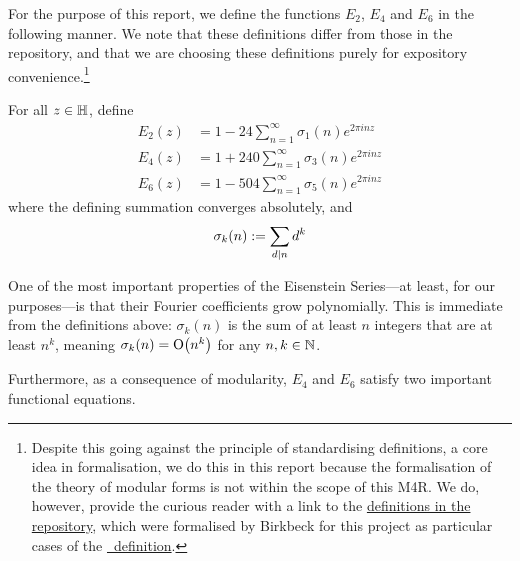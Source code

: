 For the purpose of this report, we define the functions $E_2$, $E_4$ and $E_6$ in the following manner. We note that these definitions differ from those in the repository, and that we are choosing these definitions purely for expository convenience.\footnote{{Despite this going against the principle of standardising definitions, a core idea in formalisation, we do this in this report because the formalisation of the theory of modular forms is not within the scope of this M4R. We do, however, provide the curious reader with a link to the \href{https://github.com/thefundamentaltheor3m/Sphere-Packing-Lean/blob/704c085b1251cc0c208cc373f4e6105af359edd4/SpherePacking/ModularForms/Eisenstein.lean\#L28}{definitions in the repository}, which were formalised by Birkbeck for this project as particular cases of the \href{https://github.com/leanprover-community/mathlib4/blob/70816aec3a0f7bb98ac42991652a66b6405e1a00/Mathlib/NumberTheory/ModularForms/EisensteinSeries/Basic.lean\#L28-L35}{\mathlib\ definition}.}}

\begin{boxdefinition}\label{Ch2:Def:EisensteinSeries_geq_4}
    For all $z \in \mathbb{H}$, define
    \begin{align}
        E_2(z) &= 1 - 24 \sum_{n=1}^{\infty} \sigma_1(n) e^{2 \pi i n z} \label{Ch2:Eq:E2_qexpansion} \\
        E_4(z) &= 1 + 240 \sum_{n=1}^{\infty} \sigma_3(n) e^{2 \pi i n z} \label{Ch2:Eq:E4_qexpansion} \\
        E_6(z) &= 1 - 504 \sum_{n=1}^{\infty} \sigma_5(n) e^{2 \pi i n z} \label{Ch2:Eq:E6_qexpansion}
    \end{align}
    where the defining summation converges absolutely, and
    \begin{align*}
        \sigma_k\!\left( n \right) := \sum_{d \mid n} d^k
    \end{align*}
\end{boxdefinition}

One of the most important properties of the Eisenstein Series---at least, for our purposes---is that their Fourier coefficients grow polynomially. This is immediate from the definitions above: $\sigma_k(n)$ is the sum of at least $n$ integers that are at least $n^k$, meaning $\sigma_k(n) = \operatorname{O}\!\left( n^{k} \right)$ for any $n, k \in \mathbb{N}$.

Furthermore, as a consequence of modularity, $E_4$ and $E_6$ satisfy two important functional equations.


